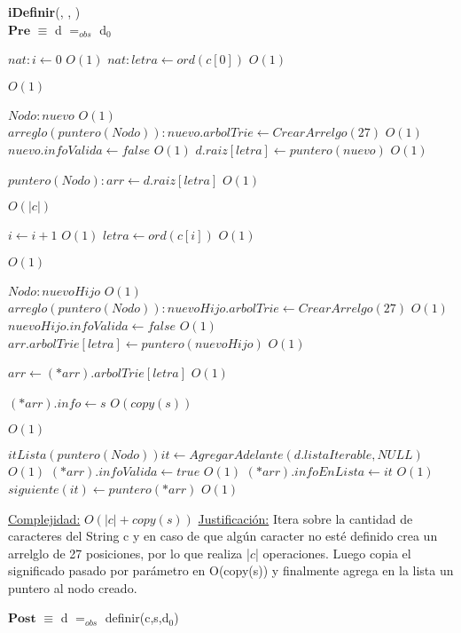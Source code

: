 \begin{algorithm}[H]{\textbf{iDefinir}(, , )}
	{\\ $\textbf{Pre}$ $\equiv$ d $=_{obs}$ d$_0$}
	\begin{algorithmic}


		\State $nat: i \gets 0$ \Comment $O(1)$
		\State $nat: letra \gets ord(c[0])$ \Comment $O(1)$
		
		 \Comment $O(1)$

			\State $Nodo: nuevo$ \Comment $O(1)$
			\State $arreglo(puntero(Nodo)): nuevo.arbolTrie \gets CrearArrelgo(27)$ \Comment $O(1)$
			\State $nuevo.infoValida \gets false$ \Comment $O(1)$
			\State $d.raiz[letra] \gets puntero(nuevo)$ \Comment $O(1)$

		\EndIf

		\State $puntero(Nodo): arr \gets d.raiz[letra]$ \Comment $O(1)$

		 \Comment $O(|c|)$

			\State $i \gets i + 1$ \Comment $O(1)$
			\State $letra \gets ord(c[i])$ \Comment $O(1)$

			 \Comment $O(1)$

				\State $Nodo: nuevoHijo$ \Comment $O(1)$
				\State $arreglo(puntero(Nodo)): nuevoHijo.arbolTrie \gets CrearArrelgo(27)$ \Comment $O(1)$
				\State $nuevoHijo.infoValida \gets false$ \Comment $O(1)$
				\State $arr.arbolTrie[letra] \gets puntero(nuevoHijo)$ \Comment $O(1)$

			\EndIf

			\State $arr \gets (*arr).arbolTrie[letra]$ \Comment $O(1)$

		\EndWhile

		\State $(*arr).info \gets s$ \Comment $O(copy(s))$

		 \Comment $O(1)$

		\State $itLista(puntero(Nodo)) it \gets AgregarAdelante(d.listaIterable,NULL)$ \Comment $O(1)$
		\State $(*arr).infoValida \gets true$ \Comment $O(1)$
		\State $(*arr).infoEnLista \gets it$ \Comment $O(1)$
		\State $siguiente(it) \gets puntero(*arr)$ \Comment $O(1)$

		\EndIf

		\medskip
		\Statex \underline{Complejidad:} $O(|c| + copy(s))$
		\Statex \underline{Justificación:} Itera sobre la cantidad de caracteres del String c y en caso de que algún caracter no esté definido crea un arrelglo de 27 posiciones, por lo que realiza |$c$| operaciones. Luego copia el significado pasado por parámetro en O(copy(s)) y finalmente agrega en la lista un puntero al nodo creado.
    \end{algorithmic}
    {$\textbf{Post}$ $\equiv$ d $=_{obs}$ definir(c,s,d$_0$)}
\end{algorithm}


